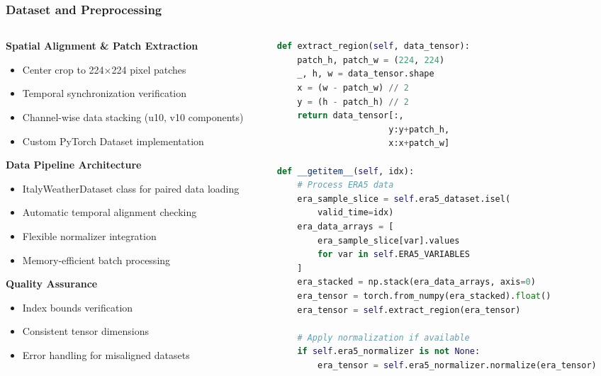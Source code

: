 \documentclass[8pt]{beamer}
\begin{document}
\begin{frame}[fragile]
\frametitle{Dataset and Preprocessing}

\begin{columns}
\begin{column}{0.6\textwidth}
\textbf{Spatial Alignment \& Patch Extraction}
\begin{itemize}
    \item Center crop to 224×224 pixel patches
    \item Temporal synchronization verification
    \item Channel-wise data stacking (u10, v10 components)
    \item Custom PyTorch Dataset implementation
\end{itemize}

\vspace{0.4cm}

\textbf{Data Pipeline Architecture}
\begin{itemize}
    \item ItalyWeatherDataset class for paired data loading
    \item Automatic temporal alignment checking
    \item Flexible normalizer integration
    \item Memory-efficient batch processing
\end{itemize}

\vspace{0.4cm}

\textbf{Quality Assurance}
\begin{itemize}
    \item Index bounds verification
    \item Consistent tensor dimensions
    \item Error handling for misaligned datasets
\end{itemize}
\end{column}

\begin{column}{0.4\textwidth}
\begin{lstlisting}[language=Python, basicstyle=\ttfamily\tiny]
def extract_region(self, data_tensor):
    patch_h, patch_w = (224, 224)
    _, h, w = data_tensor.shape
    x = (w - patch_w) // 2
    y = (h - patch_h) // 2
    return data_tensor[:, 
                      y:y+patch_h, 
                      x:x+patch_w]

def __getitem__(self, idx):
    # Process ERA5 data
    era_sample_slice = self.era5_dataset.isel(
        valid_time=idx)
    era_data_arrays = [
        era_sample_slice[var].values 
        for var in self.ERA5_VARIABLES
    ]
    era_stacked = np.stack(era_data_arrays, axis=0)
    era_tensor = torch.from_numpy(era_stacked).float()
    era_tensor = self.extract_region(era_tensor)
    
    # Apply normalization if available
    if self.era5_normalizer is not None: 
        era_tensor = self.era5_normalizer.normalize(era_tensor)
\end{lstlisting}
\end{column}
\end{columns}

\end{frame}
\end{document}
